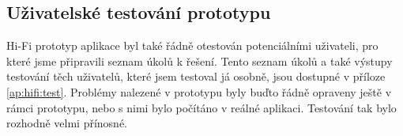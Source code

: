 
\subsection{Uživatelské testování prototypu}

Hi-Fi prototyp aplikace byl také řádně otestován potenciálními uživateli, pro které jsme připravili seznam úkolů k řešení. Tento seznam úkolů a také výstupy testování těch uživatelů, které jsem testoval já osobně, jsou dostupné v příloze \ref{ap:hifi:test}. Problémy nalezené v prototypu byly buďto řádně opraveny ještě v rámci prototypu, nebo s nimi bylo počítáno v reálné aplikaci. Testování tak bylo rozhodně velmi přínosné.
